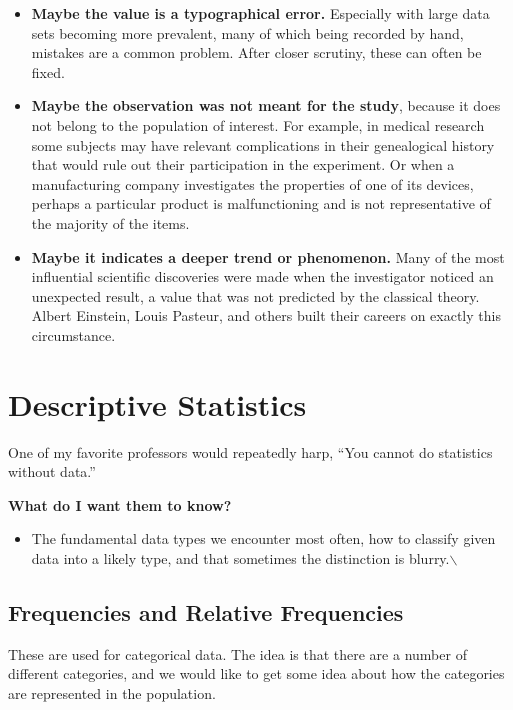 \documentclass[10pt,english]{scrbook}
\begin{document}
\begin{itemize}
\item \textbf{Maybe the value is a typographical error.} Especially with large data sets becoming more prevalent, many of which being recorded by hand, mistakes are a common problem. After closer scrutiny, these can often be fixed.

\item \textbf{Maybe the observation was not meant for the study}, because it does not belong to the population of interest. For example, in medical research some subjects may have relevant complications in their genealogical history that would rule out their participation in the experiment. Or when a manufacturing company investigates the properties of one of its devices, perhaps a particular product is malfunctioning and is not representative of the majority of the items.

\item \textbf{Maybe it indicates a deeper trend or phenomenon.} Many of the most influential scientific discoveries were made when the investigator noticed an unexpected result, a value that was not predicted by the classical theory. Albert Einstein, Louis Pasteur, and others built their careers on exactly this circumstance.
\end{itemize}
\section[Descriptive Statistics]{Descriptive Statistics}
\label{sec-1-3}

One of my favorite professors would repeatedly harp, ``You cannot do statistics without data.''  


\textbf{What do I want them to know?}
\begin{itemize}
\item The fundamental data types we encounter most often, how to classify given data into a likely type, and that sometimes the distinction is blurry.$\backslash$
\end{itemize}

\subsection[Frequencies and Relative Frequencies]{Frequencies and Relative Frequencies}
\label{sec-1-3-1}

These are used for categorical data. The idea is that there are a number of different categories, and we would like to get some idea about how the categories are represented in the population. 
\end{document}
